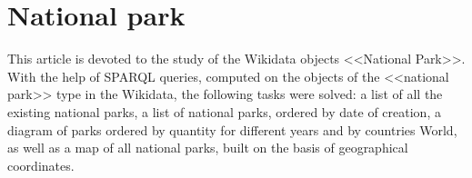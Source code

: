 \chapter{National park\protect\footnotemark}
\label{ch:national-park}


This article is devoted to the study of the Wikidata objects <<National Park>>. With the help of SPARQL queries, computed on the objects of the <<national park>> type in the Wikidata, the following tasks were solved: a list of all the existing national parks, a list of national parks, ordered by date of creation, a diagram of parks ordered by quantity for different years and by countries World, as well as a map of all national parks, built on the basis of geographical coordinates.